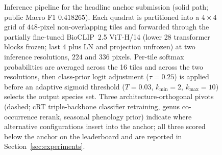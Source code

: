 \documentclass[sigconf]{ceurart}
\begin{document}
\begin{figure}[t]
  \centering
  \resizebox{0.95\linewidth}{!}{}
  \caption{Inference pipeline for the headline anchor submission (solid path; public Macro F1 $0.418265$). Each quadrat is partitioned into a $4{\times}4$ grid of $448$-pixel non-overlapping tiles and forwarded through the partially fine-tuned BioCLIP~2.5 ViT-H/14 (lower 28 transformer blocks frozen; last 4 plus LN and projection unfrozen) at two inference resolutions, $224$ and $336$ pixels. Per-tile softmax probabilities are averaged across the 16 tiles and across the two resolutions, then class-prior logit adjustment ($\tau{=}0.25$) is applied before an adaptive sigmoid threshold ($T{=}0.03$, $k_{\min}{=}2$, $k_{\max}{=}10$) selects the output species set. Three architecture-orthogonal pivots (dashed; cRT triple-backbone classifier retraining, genus co-occurrence rerank, seasonal phenology prior) indicate where alternative configurations insert into the anchor; all three scored below the anchor on the leaderboard and are reported in Section~\ref{sec:experiments}.}
  \label{fig:pipeline}
\end{figure}
\end{document}
